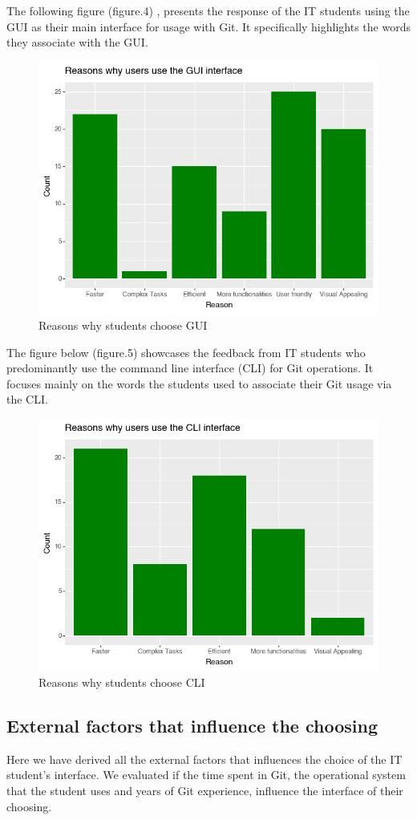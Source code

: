 \documentclass[]{report}
\begin{document}
	The following figure (figure.4) , presents the response of the IT students using the GUI as their main interface for usage with Git. It specifically highlights the words they associate with the GUI.
		\begin{figure}[H]
		\centering
		\includegraphics[width=0.75\linewidth]{ReasonsGUI}
		\caption{Reasons why students choose GUI}
		\label{fig: 4}
	\end{figure}
	
	The figure below (figure.5) showcases the feedback from IT students who predominantly use the command line interface (CLI) for Git operations. It focuses mainly on the words the students used to associate their Git usage via the CLI. 
	\begin{figure}[H]
		\centering
		\includegraphics[width=0.75\linewidth]{ReasonsCLI}
		\caption{Reasons why students choose CLI}
		\label{fig: 5}
	\end{figure}
	
	\subsection{External factors that influence the choosing }
	Here we have derived all the external factors that influences the choice of the IT student's interface.  We evaluated if the time spent in Git, the operational system that the student uses and years of Git experience, influence the interface of their choosing.\\
	
\end{document}
